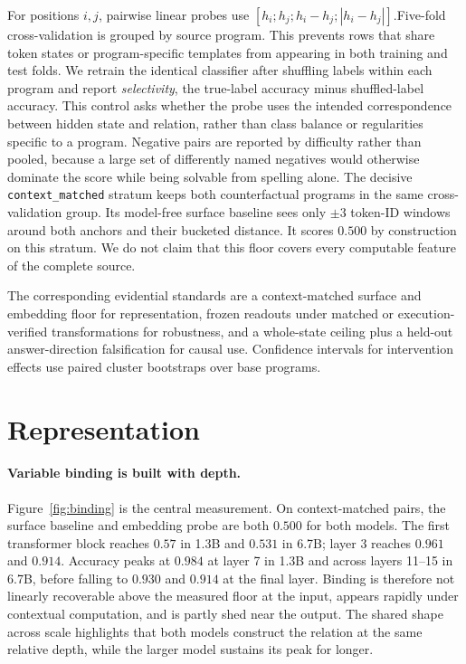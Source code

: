 \documentclass{article}
\begin{document}
For positions $i,j$, pairwise linear probes use
$ [h_i;h_j;h_i-h_j;|h_i-h_j|].$Five-fold cross-validation is grouped by source program. This prevents rows that share token states or program-specific templates from appearing in both training and test folds. We retrain the identical classifier after shuffling labels within each program and report \emph{selectivity}, the true-label accuracy minus shuffled-label accuracy. This control asks whether the probe uses the intended correspondence between hidden state and relation, rather than class balance or regularities specific to a program. Negative pairs are reported by difficulty rather than pooled, because a large set of differently named negatives would otherwise dominate the score while being solvable from spelling alone. The decisive \texttt{context\_matched} stratum keeps both counterfactual programs in the same cross-validation group. Its model-free surface baseline sees only $\pm3$ token-ID windows around both anchors and their bucketed distance. It scores $0.500$ by construction on this stratum. We do not claim that this floor covers every computable feature of the complete source.

The corresponding evidential standards are a context-matched surface and embedding floor for representation, frozen readouts under matched or execution-verified transformations for robustness, and a whole-state ceiling plus a held-out answer-direction falsification for causal use. Confidence intervals for intervention effects use paired cluster bootstraps over base programs.

\section{Representation}
\label{sec:representation}

\paragraph{Variable binding is built with depth.}
Figure~\ref{fig:binding} is the central measurement. On context-matched pairs, the surface baseline and embedding probe are both $0.500$ for both models. The first transformer block reaches $0.57$ in 1.3B and $0.531$ in 6.7B; layer 3 reaches $0.961$ and $0.914$. Accuracy peaks at $0.984$ at layer 7 in 1.3B and across layers 11--15 in 6.7B, before falling to $0.930$ and $0.914$ at the final layer. Binding is therefore not linearly recoverable above the measured floor at the input, appears rapidly under contextual computation, and is partly shed near the output. The shared shape across scale highlights that both models construct the relation at the same relative depth, while the larger model sustains its peak for longer.
\end{document}
